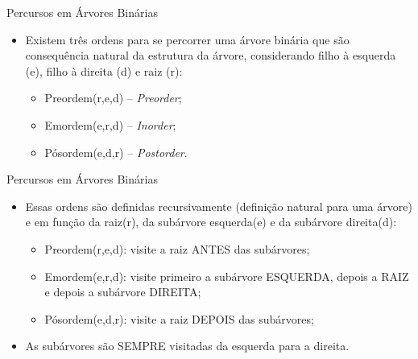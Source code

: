 \documentclass[12pt,table,xcolor={dvipsnames}]{beamer}
\begin{document}
\begin{frame}[fragile]{Percursos em Árvores Binárias}
          \begin{itemize}
          \item Existem três ordens para se percorrer uma árvore binária que são consequência natural da estrutura da árvore, considerando filho à esquerda (e), filho à direita (d) e raiz (r):
          \begin{itemize}
          \item Preordem(r,e,d) – \textit{Preorder};
          \item Emordem(e,r,d) – \textit{Inorder};
          \item Pósordem(e,d,r) – \textit{Postorder}.
          \end{itemize}
       	  \end{itemize}
\end{frame}

\begin{frame}[fragile]{Percursos em Árvores Binárias}
          \begin{itemize}
          \item Essas ordens são definidas recursivamente (definição natural para uma árvore) e em função da raiz(r), da subárvore esquerda(e) e da subárvore direita(d):
          \begin{itemize}
          \item Preordem(r,e,d): visite a raiz ANTES das subárvores;
          \item Emordem(e,r,d): visite primeiro a subárvore ESQUERDA, depois a RAIZ e depois a subárvore DIREITA;
          \item Pósordem(e,d,r): visite a raiz DEPOIS das subárvores;
          \end{itemize}
          \item As subárvores são SEMPRE visitadas da esquerda para a direita.
       	  \end{itemize}
\end{frame}
\end{document}

